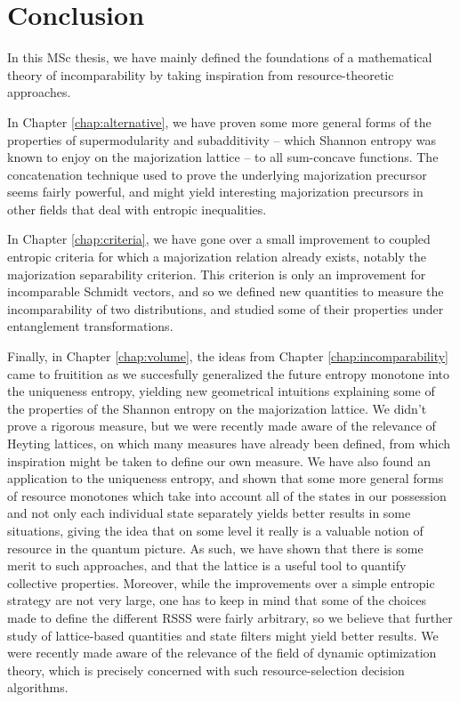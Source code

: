 \chapter{Conclusion}

In this MSc thesis, we have mainly defined the foundations of a mathematical theory of incomparability by taking inspiration from resource-theoretic approaches.

In Chapter \ref{chap:alternative}, we have proven some more general forms of the properties of supermodularity and subadditivity -- which Shannon entropy was known to enjoy on the majorization lattice -- to all sum-concave functions. The concatenation technique used to prove the underlying majorization precursor seems fairly powerful, and might yield interesting majorization precursors in other fields that deal with entropic inequalities.

In Chapter \ref{chap:criteria}, we have gone over a small improvement to coupled entropic criteria for which a majorization relation already exists, notably the majorization separability criterion. This criterion is only an improvement for incomparable Schmidt vectors, and so we defined new quantities to measure the incomparability of two distributions, and studied some of their properties under entanglement transformations.

Finally, in Chapter \ref{chap:volume}, the ideas from Chapter \ref{chap:incomparability} came to fruitition as we succesfully generalized the future entropy monotone into the uniqueness entropy, yielding new geometrical intuitions explaining some of the properties of the Shannon entropy on the majorization lattice. We didn't prove a rigorous measure, but we were recently made aware of the relevance of Heyting lattices, on which many measures have already been defined, from which inspiration might be taken to define our own measure. We have also found an application to the uniqueness entropy, and shown that some more general forms of resource monotones which take into account all of the states in our possession and not only each individual state separately yields better results in some situations, giving the idea that on some level it really is a valuable notion of resource in the quantum picture. As such, we have shown that there is some merit to such approaches, and that the lattice is a useful tool to quantify collective properties. Moreover, while the improvements over a simple entropic strategy are not very large, one has to keep in mind that some of the choices made to define the different RSSS were fairly arbitrary, so we believe that further study of lattice-based quantities and state filters might yield better results. We were recently made aware of the relevance of the field of dynamic optimization theory, which is precisely concerned with such resource-selection decision algorithms.

